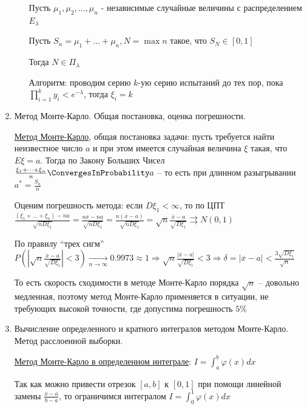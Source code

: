 \begin{enumerate}
\begin{enumerate}[label*=\Roman*. ]
        \begin{MyTheorem}
            \Ths Пусть $\mu_1, \mu_2, \dots, \mu_n$ - независимые случайные величины с распределением $E_\lambda$

            Пусть $S_n = \mu_1 + \dots + \mu_n, N = \max n$ такое, что $S_N \in [0, 1]$

            Тогда $N \in \Pi_\lambda$
        \end{MyTheorem}

        Алгоритм: проводим серию $k$-ую серию испытаний до тех пор, пока $\prod^k_{i = 1} y_i < e^{-\lambda}$, тогда $\xi_i = k$

    \end{enumerate}


    \item Метод Монте-Карло. Общая постановка, оценка погрешности.

    \hyperlink{monte_carlo}{Метод Монте-Карло}, общая постановка задачи: пусть требуется найти неизвестное число $a$ и при этом имеется случайная величина $\xi$ такая, что $E \xi = a$. Тогда по Закону Больших Чисел $\frac{\xi_1 + \dots + \xi_n}{n} \ConvergesInProbability a$ -- то есть при длинном разыгрывании $a^* = \frac{S_n}{n}$

    Оценим погрешность метода: если $D\xi_1 < \infty$, то по ЦПТ $\frac{(\xi_1 + \dots + \xi_n) - n a}{\sqrt{n D \xi_1}} = \frac{n \overline{x} - na}{\sqrt{n D\xi_1}} = \frac{n(\overline{x} - a)}{\sqrt{n D\xi_1}} = \sqrt{n} \frac{\overline{x} - a}{\sqrt{D\xi_1}} \rightrightarrows N(0, 1)$

    По правилу \enquote{трех сигм} $P\left(\left|\sqrt{n} \frac{\overline{x} - a}{\sqrt{D\xi_1}}\right| < 3\right) \underset{n \to \infty}{\longrightarrow} 0.9973 \approx 1 \Longrightarrow \sqrt{n} \frac{|\overline{x} - a|}{\sqrt{D \xi_1}} < 3 \Longrightarrow \delta = |\overline{x} - a| < \frac{3\sqrt{D\xi_1}}{\sqrt{n}}$

    \Nota То есть скорость сходимости в методе Монте-Карло порядка $\sqrt{n}$ -- довольно медленная, поэтому метод Монте-Карло применяется в ситуации, не требующих высокой точности, где допустима погрешность $5\%$

    \item Вычисление определенного и кратного интегралов методом Монте-Карло. Метод расслоенной выборки.

    \hyperlink{monte_carlo_integral}{Метод Монте-Карло в определенном интеграле}: $I = \int_a^b \varphi(x) dx$

    Так как можно привести отрезок $[a, b]$ к $[0, 1]$ при помощи линейной замены $\frac{x - a}{b - a}$, то ограничимся интегралом $I = \int_0^1 \varphi(x) dx$


\end{enumerate}
